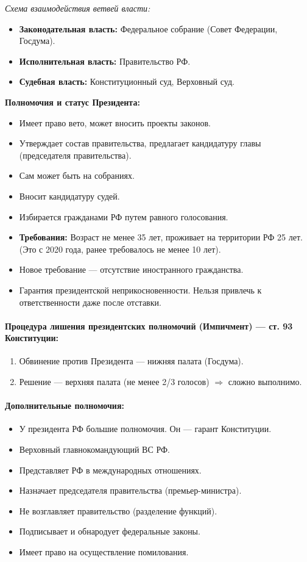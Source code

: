 \documentclass[12pt]{article}
\begin{document}
	\textit{Схема взаимодействия ветвей власти:}
	\begin{itemize}
		\item \textbf{Законодательная власть:} Федеральное собрание (Совет Федерации, Госдума).
		\item \textbf{Исполнительная власть:} Правительство РФ.
		\item \textbf{Судебная власть:} Конституционный суд, Верховный суд.
	\end{itemize}
	
	\textbf{Полномочия и статус Президента:}
	\begin{itemize}
		\item Имеет право вето, может вносить проекты законов.
		\item Утверждает состав правительства, предлагает кандидатуру главы (председателя правительства).
		\item Сам может быть на собраниях.
		\item Вносит кандидатуру судей.
		\item Избирается гражданами РФ путем равного голосования.
		\item \textbf{Требования:} Возраст не менее 35 лет, проживает на территории РФ 25 лет. (Это с 2020 года, ранее требовалось не менее 10 лет).
		\item Новое требование --- отсутствие иностранного гражданства.
		\item Гарантия президентской неприкосновенности. Нельзя привлечь к ответственности даже после отставки.
	\end{itemize}
	
	\paragraph{Процедура лишения президентских полномочий (Импичмент) --- ст. 93 Конституции:}
	\begin{enumerate}
		\item Обвинение против Президента --- нижняя палата (Госдума).
		\item Решение --- верхняя палата (не менее 2/3 голосов) $\Rightarrow$ сложно выполнимо.
	\end{enumerate}
	
	\paragraph{Дополнительные полномочия:}
	\begin{itemize}
		\item У президента РФ большие полномочия. Он --- гарант Конституции.
		\item Верховный главнокомандующий ВС РФ.
		\item Представляет РФ в международных отношениях.
		\item Назначает председателя правительства (премьер-министра).
		\item Не возглавляет правительство (разделение функций).
		\item Подписывает и обнародует федеральные законы.
		\item Имеет право на осуществление помилования.
	\end{itemize}
	
\end{document}
